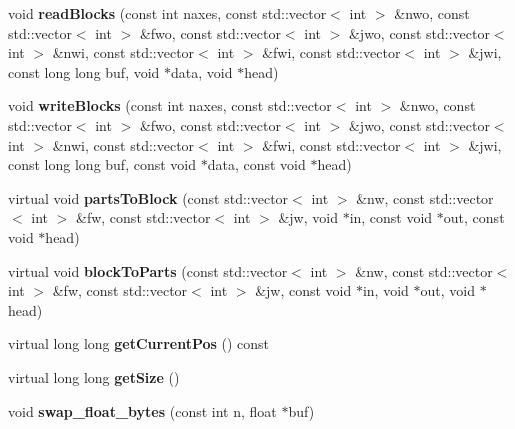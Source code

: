 \begin{DoxyCompactItemize}
void {\bfseries read\+Blocks} (const int naxes, const std\+::vector$<$ int $>$ \&nwo, const std\+::vector$<$ int $>$ \&fwo, const std\+::vector$<$ int $>$ \&jwo, const std\+::vector$<$ int $>$ \&nwi, const std\+::vector$<$ int $>$ \&fwi, const std\+::vector$<$ int $>$ \&jwi, const long long buf, void $\ast$data, void $\ast$head)
\item 
\mbox{\label{class_s_e_p_1_1basic_i_o_a409a1fb1590a84b779273fd1e54b4411}} 
void {\bfseries write\+Blocks} (const int naxes, const std\+::vector$<$ int $>$ \&nwo, const std\+::vector$<$ int $>$ \&fwo, const std\+::vector$<$ int $>$ \&jwo, const std\+::vector$<$ int $>$ \&nwi, const std\+::vector$<$ int $>$ \&fwi, const std\+::vector$<$ int $>$ \&jwi, const long long buf, const void $\ast$data, const void $\ast$head)
\item 
\mbox{\label{class_s_e_p_1_1basic_i_o_a097a7edd63228d565843d6359a958506}} 
virtual void {\bfseries parts\+To\+Block} (const std\+::vector$<$ int $>$ \&nw, const std\+::vector$<$ int $>$ \&fw, const std\+::vector$<$ int $>$ \&jw, void $\ast$in, const void $\ast$out, const void $\ast$head)
\item 
\mbox{\label{class_s_e_p_1_1basic_i_o_aa1ae956a7222bdc316ecd085ed86f77f}} 
virtual void {\bfseries block\+To\+Parts} (const std\+::vector$<$ int $>$ \&nw, const std\+::vector$<$ int $>$ \&fw, const std\+::vector$<$ int $>$ \&jw, const void $\ast$in, void $\ast$out, void $\ast$head)
\item 
\mbox{\label{class_s_e_p_1_1basic_i_o_aa62ff4849c21ca079c99a4831b45820c}} 
virtual long long {\bfseries get\+Current\+Pos} () const
\item 
\mbox{\label{class_s_e_p_1_1basic_i_o_aa753bc8e6a8862a5aa77e390f21a6a1e}} 
virtual long long {\bfseries get\+Size} ()
\item 
\mbox{\label{class_s_e_p_1_1basic_i_o_aabbcc3c28a5095c82ecb935500ef847d}} 
void {\bfseries swap\+\_\+float\+\_\+bytes} (const int n, float $\ast$buf)
\item 
\mbox{\label{class_s_e_p_1_1basic_i_o_a170d1a8902624349060bbfe430aa5908}} 

\end{DoxyCompactItemize}
